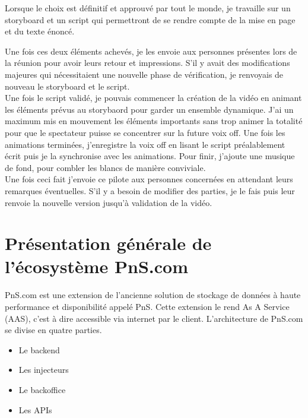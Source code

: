 Lorsque le choix est définitif et approuvé par tout le monde, je travaille sur un storyboard et un script qui permettront de se rendre compte de la mise en page et du texte énoncé. 


Une fois ces deux éléments achevés, je les envoie aux personnes présentes lors de la réunion pour avoir leurs retour et impressions. S'il y avait des modifications majeures qui nécessitaient une nouvelle phase de vérification, je renvoyais de nouveau le storyboard et le script.\\


Une fois le script validé, je pouvais commencer la création de la vidéo en animant les éléments prévus au storybaord pour garder un ensemble dynamique. J'ai un maximum mis en mouvement les éléments importants sans trop animer la totalité pour que le spectateur puisse se concentrer sur la future voix off. Une fois les animations terminées, j'enregistre la voix off en lisant le script préalablement écrit puis je la synchronise avec les animations. Pour finir, j'ajoute une musique de fond, pour combler les blancs de manière conviviale.\\

Une fois ceci fait j'envoie ce pilote aux personnes concernées en attendant leurs remarques éventuelles. S'il y a besoin de modifier des parties, je le fais puis leur renvoie la nouvelle version jusqu'à validation de la vidéo.



\section{Présentation générale de l'écosystème PnS.com}


PnS.com est une extension de l'ancienne solution de stockage de données à haute performance et disponibilité appelé PnS. Cette extension le rend As A Service (AAS), c'est à dire accessible via internet par le client. L'architecture de PnS.com se divise en quatre parties.

\begin{itemize}
    \item Le backend
    \item Les injecteurs
    \item Le backoffice
    \item Les APIs
\end{itemize}

